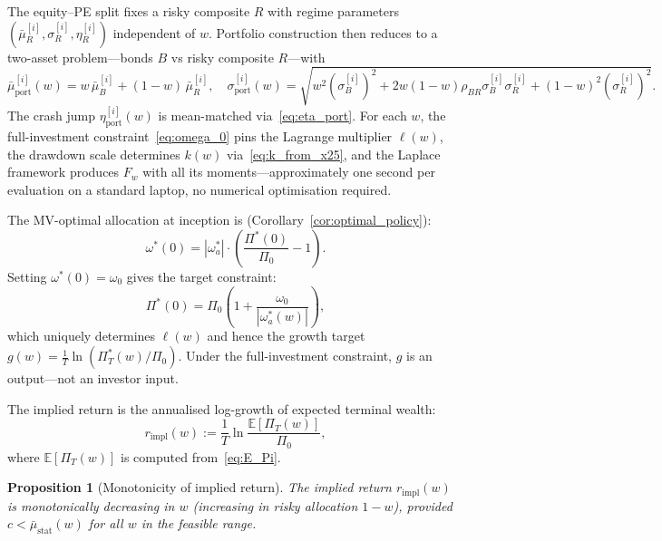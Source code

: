 \documentclass[11pt,a4paper]{article}
\numberwithin{equation}{section}
\newtheorem{proposition}[theorem]{Proposition}
\newcommand{\E}{\mathbb{E}}
\begin{document}
The equity--PE split fixes a risky composite $R$ with regime parameters 
$(\bar{\mu}^{[i]}_R, \sigma^{[i]}_R, \eta^{[i]}_R)$ independent of $w$. 
Portfolio construction then reduces to a two-asset problem---bonds $B$ 
vs risky composite $R$---with
\begin{equation}\label{eq:two_asset}
\bar{\mu}^{[i]}_{\mathrm{port}}(w) = w\,\bar{\mu}^{[i]}_B + (1-w)\,
\bar{\mu}^{[i]}_R, \quad
\sigma^{[i]}_{\mathrm{port}}(w) = \sqrt{w^2(\sigma^{[i]}_B)^2 
+ 2w(1-w)\rho_{BR}\sigma^{[i]}_B\sigma^{[i]}_R 
+ (1-w)^2(\sigma^{[i]}_R)^2}.
\end{equation}
The crash jump $\eta^{[i]}_{\mathrm{port}}(w)$ is mean-matched 
via~\eqref{eq:eta_port}. For each $w$, the full-investment 
constraint~\eqref{eq:omega_0} pins the Lagrange multiplier $\ell(w)$, the 
drawdown scale determines $k(w)$ via~\eqref{eq:k_from_x25}, and the 
Laplace framework produces $F_w$ with all its moments---approximately one 
second per evaluation on a standard laptop, no numerical optimisation required.

The MV-optimal allocation at inception is 
(Corollary~\ref{cor:optimal_policy}):
\begin{equation}\label{eq:omega_0}
\omega^*(0) = |\omega^*_a| \cdot \left(\frac{\Pi^*(0)}{\Pi_0} 
- 1\right).
\end{equation}
Setting $\omega^*(0) = \omega_0$ gives the target constraint:
\begin{equation}\label{eq:pi_star_0}
\Pi^*(0) = \Pi_0 \left(1 + \frac{\omega_0}{|\omega^*_a(w)|}\right),
\end{equation}
which uniquely determines $\ell(w)$ and hence the growth target 
$g(w) = \frac{1}{T}\ln(\Pi^*_T(w)/\Pi_0)$. Under the full-investment 
constraint, $g$ is an output---not an investor input.

The implied return is the annualised log-growth of expected terminal 
wealth:
\begin{equation}\label{eq:r_impl}
r_{\mathrm{impl}}(w) := \frac{1}{T} \ln \frac{\E[\Pi_T(w)]}{\Pi_0},
\end{equation}
where $\E[\Pi_T(w)]$ is computed from~\eqref{eq:E_Pi}.

\begin{proposition}[Monotonicity of implied return]%
\label{prop:r_impl_monotone}
The implied return $r_{\mathrm{impl}}(w)$ is monotonically decreasing 
in $w$ (increasing in risky allocation $1-w$), provided 
$c < \bar{\mu}_{\mathrm{stat}}(w)$ for all $w$ in the feasible range.
\end{proposition}
\end{document}
